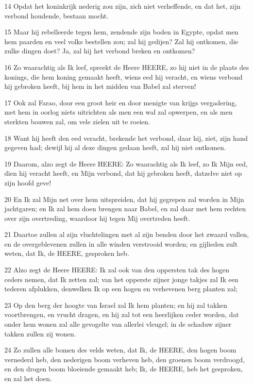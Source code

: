 \par 14 Opdat het koninkrijk nederig zou zijn, zich niet verheffende, en dat het, zijn verbond houdende, bestaan mocht.
\par 15 Maar hij rebelleerde tegen hem, zendende zijn boden in Egypte, opdat men hem paarden en veel volks bestellen zou; zal hij gedijen? Zal hij ontkomen, die zulke dingen doet? Ja, zal hij het verbond breken en ontkomen?
\par 16 Zo waarachtig als Ik leef, spreekt de Heere HEERE, zo hij niet in de plaats des konings, die hem koning gemaakt heeft, wiens eed hij veracht, en wiens verbond hij gebroken heeft, bij hem in het midden van Babel zal sterven!
\par 17 Ook zal Farao, door een groot heir en door menigte van krijgs vergadering, met hem in oorlog niets uitrichten als men een wal zal opwerpen, en als men sterkten bouwen zal, om vele zielen uit te roeien.
\par 18 Want hij heeft den eed veracht, brekende het verbond, daar hij, ziet, zijn hand gegeven had; dewijl hij al deze dingen gedaan heeft, zal hij niet ontkomen.
\par 19 Daarom, alzo zegt de Heere HEERE: Zo waarachtig als Ik leef, zo Ik Mijn eed, dien hij veracht heeft, en Mijn verbond, dat hij gebroken heeft, datzelve niet op zijn hoofd geve!
\par 20 En Ik zal Mijn net over hem uitspreiden, dat hij gegrepen zal worden in Mijn jachtgaren; en Ik zal hem doen brengen naar Babel, en zal daar met hem rechten over zijn overtreding, waardoor hij tegen Mij overtreden heeft.
\par 21 Daartoe zullen al zijn vluchtelingen met al zijn benden door het zwaard vallen, en de overgeblevenen zullen in alle winden verstrooid worden; en gijlieden zult weten, dat Ik, de HEERE, gesproken heb.
\par 22 Alzo zegt de Heere HEERE: Ik zal ook van den oppersten tak des hogen ceders nemen, dat Ik zetten zal; van het opperste zijner jonge takjes zal Ik een tederen afplukken, denwelken Ik op een hogen en verhevenen berg planten zal;
\par 23 Op den berg der hoogte van Israel zal Ik hem planten; en hij zal takken voortbrengen, en vrucht dragen, en hij zal tot een heerlijken ceder worden, dat onder hem wonen zal alle gevogelte van allerlei vleugel; in de schaduw zijner takken zullen zij wonen.
\par 24 Zo zullen alle bomen des velds weten, dat Ik, de HEERE, den hogen boom vernederd heb, den nederigen boom verheven heb, den groenen boom verdroogd, en den drogen boom bloeiende gemaakt heb; Ik, de HEERE, heb het gesproken, en zal het doen.

